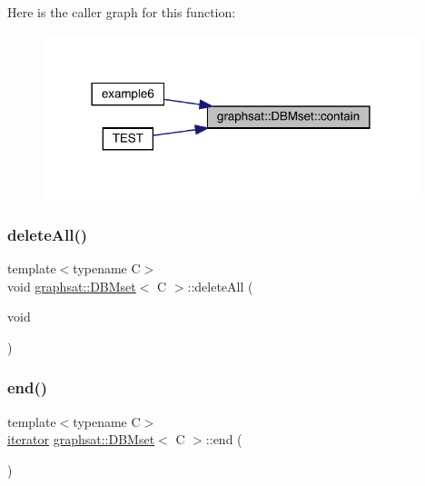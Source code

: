 Here is the caller graph for this function\+:
\nopagebreak
\begin{figure}[H]
\begin{center}
\leavevmode
\includegraphics[width=309pt]{classgraphsat_1_1_d_b_mset_a3ccc996dbe06983ad22b15791c0d8173_icgraph}
\end{center}
\end{figure}
\mbox{\label{classgraphsat_1_1_d_b_mset_a0c9433f18627b5f4f4c7567663cf09a3}} 
\subsubsection{\texorpdfstring{deleteAll()}{deleteAll()}}
{\footnotesize\ttfamily template$<$typename C$>$ \\
void \mbox{\hyperlink{classgraphsat_1_1_d_b_mset}{graphsat\+::\+D\+B\+Mset}}$<$ C $>$\+::delete\+All (\begin{DoxyParamCaption}\item[{void}]{ }\end{DoxyParamCaption})\hspace{0.3cm}{\ttfamily [inline]}}

\mbox{\label{classgraphsat_1_1_d_b_mset_ade948f2f96fe55fa3fba669c0035f6fe}} 
\subsubsection{\texorpdfstring{end()}{end()}\hspace{0.1cm}{\footnotesize\ttfamily [1/2]}}
{\footnotesize\ttfamily template$<$typename C$>$ \\
\mbox{\hyperlink{classgraphsat_1_1_d_b_mset_1_1iterator}{iterator}} \mbox{\hyperlink{classgraphsat_1_1_d_b_mset}{graphsat\+::\+D\+B\+Mset}}$<$ C $>$\+::end (\begin{DoxyParamCaption}{ }\end{DoxyParamCaption})\hspace{0.3cm}{\ttfamily [inline]}}

